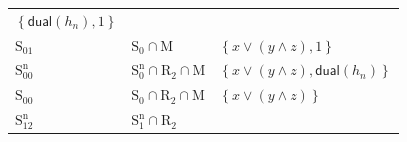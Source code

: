 \documentclass[10pt,a4paper]{article}
\newcommand{\set}[1]{\left\{#1\right\}}
\newcommand{\dual}{\mathsf{dual}}
\newcommand{\clonefont}[1]{\mathrm{#1}}
\begin{document}
\begin{figure}[hbtp]
\begin{small}
\begin{longtable}[]{p{}p{}p{}}
\begin{minipage}[t]{0.38\columnwidth}
                \(\set{\dual(h_n), 1}\)\strut
            \end{minipage}\tabularnewline
            \begin{minipage}[t]{0.12\columnwidth}\raggedright
                \(\clonefont{S_{01}}\)\strut
            \end{minipage} & \begin{minipage}[t]{0.41\columnwidth}\raggedright
                \(\clonefont{S_0} \cap \clonefont{M}\)\strut
            \end{minipage} & \begin{minipage}[t]{0.38\columnwidth}\raggedright
                \(\set{x \lor (y \land z), 1}\)\strut
            \end{minipage}\tabularnewline
            \begin{minipage}[t]{0.12\columnwidth}\raggedright
                \(\clonefont{S_{00}^n}\)\strut
            \end{minipage} & \begin{minipage}[t]{0.41\columnwidth}\raggedright
                \(\clonefont{S_0^n} \cap \clonefont{R_2} \cap \clonefont{M}\)\strut
            \end{minipage} & \begin{minipage}[t]{0.38\columnwidth}\raggedright
                \(\set{x \lor (y \land z), \dual(h_n)}\)\strut
            \end{minipage}\tabularnewline
            \begin{minipage}[t]{0.12\columnwidth}\raggedright
                \(\clonefont{S_{00}}\)\strut
            \end{minipage} & \begin{minipage}[t]{0.41\columnwidth}\raggedright
                \(\clonefont{S_0} \cap \clonefont{R_2} \cap \clonefont{M}\)\strut
            \end{minipage} & \begin{minipage}[t]{0.38\columnwidth}\raggedright
                \(\set{x \lor (y \land z)}\)\strut
            \end{minipage}\tabularnewline
            \begin{minipage}[t]{0.12\columnwidth}\raggedright
                \(\clonefont{S_{12}^n}\)\strut
            \end{minipage} & \begin{minipage}[t]{0.41\columnwidth}\raggedright
                \(\clonefont{S_1^n} \cap \clonefont{R_2}\)\strut
            \end{minipage} & \begin{minipage}[t]{0.38\columnwidth}\raggedright

\end{minipage}
\end{longtable}
\end{small}
\end{figure}
\end{document}

